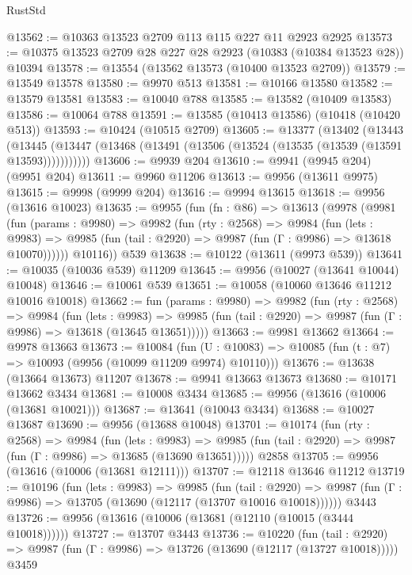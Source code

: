 \begin{lexlean}{RustStd}
\begin{coremodule}
@13562 := @10363 @13523 @2709 @113 @115 @227 @11 @2923 @2925
@13573 := @10375 @13523 @2709 @28 @227 @28 @2923 (@10383 (@10384 @13523 @28)) @10394
@13578 := @13554 (@13562 @13573 (@10400 @13523 @2709))
@13579 := @13549 @13578
@13580 := @9970 @513
@13581 := @10166 @13580
@13582 := @13579 @13581
@13583 := @10040 @788
@13585 := @13582 (@10409 @13583)
@13586 := @10064 @788
@13591 := @13585 (@10413 @13586) (@10418 (@10420 @513))
@13593 := @10424 (@10515 @2709)
@13605 := @13377
    (@13402
      (@13443
        (@13445 (@13447 (@13468 (@13491 (@13506 (@13524 (@13535 (@13539 (@13591 @13593)))))))))))
@13606 := @9939 @204
@13610 := @9941 (@9945 @204) (@9951 @204)
@13611 := @9960 @11206
@13613 := @9956 (@13611 @9975)
@13615 := @9998 (@9999 @204)
@13616 := @9994 @13615
@13618 := @9956 (@13616 @10023)
@13635 := @9955
    (fun (fn : @86) =>
    @13613
      (@9978
        (@9981
          (fun (params : @9980) =>
          @9982
            (fun (rty : @2568) =>
            @9984
              (fun (lets : @9983) =>
              @9985 (fun (tail : @2920) => @9987 (fun (Γ : @9986) => @13618 @10070))))))
        @10116))
    @539
@13638 := @10122 (@13611 (@9973 @539))
@13641 := @10035 (@10036 @539) @11209
@13645 := @9956 (@10027 (@13641 @10044) @10048)
@13646 := @10061 @539
@13651 := @10058 (@10060 @13646 @11212 @10016 @10018)
@13662 := fun (params : @9980) =>
  @9982
    (fun (rty : @2568) =>
    @9984
      (fun (lets : @9983) =>
      @9985 (fun (tail : @2920) => @9987 (fun (Γ : @9986) => @13618 (@13645 @13651)))))
@13663 := @9981 @13662
@13664 := @9978 @13663
@13673 := @10084
    (fun (U : @10083) => @10085 (fun (t : @7) => @10093 (@9956 (@10099 @11209 @9974) @10110)))
@13676 := @13638 (@13664 @13673) @11207
@13678 := @9941 @13663 @13673
@13680 := @10171 @13662 @3434
@13681 := @10008 @3434
@13685 := @9956 (@13616 (@10006 (@13681 @10021)))
@13687 := @13641 (@10043 @3434)
@13688 := @10027 @13687
@13690 := @9956 (@13688 @10048)
@13701 := @10174
    (fun (rty : @2568) =>
    @9984
      (fun (lets : @9983) =>
      @9985 (fun (tail : @2920) => @9987 (fun (Γ : @9986) => @13685 (@13690 @13651)))))
    @2858
@13705 := @9956 (@13616 (@10006 (@13681 @12111)))
@13707 := @12118 @13646 @11212
@13719 := @10196
    (fun (lets : @9983) =>
    @9985
      (fun (tail : @2920) =>
      @9987 (fun (Γ : @9986) => @13705 (@13690 (@12117 (@13707 @10016 @10018))))))
    @3443
@13726 := @9956 (@13616 (@10006 (@13681 (@12110 (@10015 (@3444 @10018))))))
@13727 := @13707 @3443
@13736 := @10220
    (fun (tail : @2920) => @9987 (fun (Γ : @9986) => @13726 (@13690 (@12117 (@13727 @10018)))))
    @3459

\end{coremodule}
\end{lexlean}
